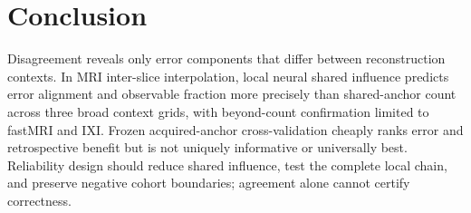 \documentclass[10pt,twocolumn,letterpaper]{article}
\begin{document}
\section{Conclusion}
Disagreement reveals only error components that differ between reconstruction contexts. In MRI inter-slice interpolation, local neural shared influence predicts error alignment and observable fraction more precisely than shared-anchor count across three broad context grids, with beyond-count confirmation limited to fastMRI and IXI. Frozen acquired-anchor cross-validation cheaply ranks error and retrospective benefit but is not uniquely informative or universally best. Reliability design should reduce shared influence, test the complete local chain, and preserve negative cohort boundaries; agreement alone cannot certify correctness.

{\small


}
\end{document}
